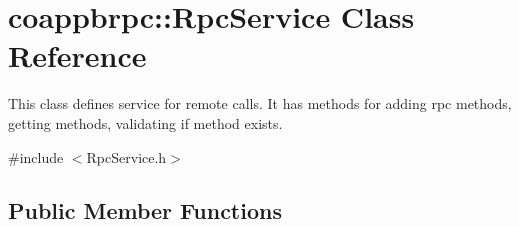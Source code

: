 \hypertarget{classcoappbrpc_1_1RpcService}{}\section{coappbrpc\+:\+:Rpc\+Service Class Reference}
\label{classcoappbrpc_1_1RpcService}


This class defines service for remote calls. It has methods for adding rpc methods, getting methods, validating if method exists.  




{\ttfamily \#include $<$Rpc\+Service.\+h$>$}

\subsection*{Public Member Functions}
